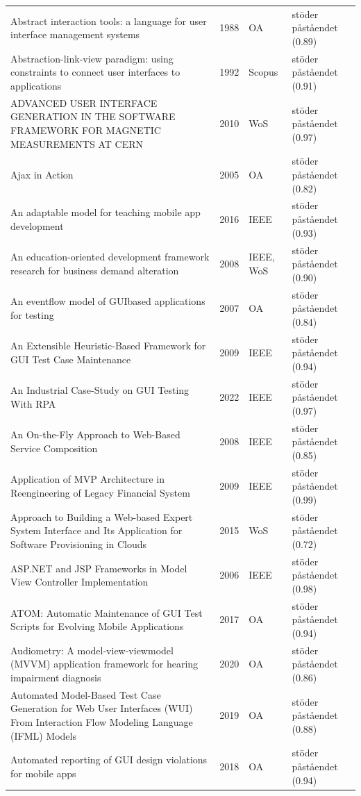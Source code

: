 \begin{longtable}{@{}%
  >{\raggedright\arraybackslash}p{}c%
  >{\raggedright\arraybackslash}p{}%
  >{\raggedright\arraybackslash}p{}@{}}
Abstract interaction tools: a language for user interface management systems & 1988 & OA & stöder påståendet (0.89) \\
Abstraction-link-view paradigm: using constraints to connect user interfaces to applications & 1992 & Scopus & stöder påståendet (0.91) \\
ADVANCED USER INTERFACE GENERATION IN THE SOFTWARE FRAMEWORK FOR MAGNETIC MEASUREMENTS AT CERN & 2010 & WoS & stöder påståendet (0.97) \\
Ajax in Action & 2005 & OA & stöder påståendet (0.82) \\
An adaptable model for teaching mobile app development & 2016 & IEEE & stöder påståendet (0.93) \\
An education-oriented development framework research for business demand alteration & 2008 & IEEE, WoS & stöder påståendet (0.90) \\
An eventflow model of GUIbased applications for testing & 2007 & OA & stöder påståendet (0.84) \\
An Extensible Heuristic-Based Framework for GUI Test Case Maintenance & 2009 & IEEE & stöder påståendet (0.94) \\
An Industrial Case-Study on GUI Testing With RPA & 2022 & IEEE & stöder påståendet (0.97) \\
An On-the-Fly Approach to Web-Based Service Composition & 2008 & IEEE & stöder påståendet (0.85) \\
Application of MVP Architecture in Reengineering of Legacy Financial System & 2009 & IEEE & stöder påståendet (0.99) \\
Approach to Building a Web-based Expert System Interface and Its Application for Software Provisioning in Clouds & 2015 & WoS & stöder påståendet (0.72) \\
ASP.NET and JSP Frameworks in Model View Controller Implementation & 2006 & IEEE & stöder påståendet (0.98) \\
ATOM: Automatic Maintenance of GUI Test Scripts for Evolving Mobile Applications & 2017 & OA & stöder påståendet (0.94) \\
Audiometry: A model-view-viewmodel (MVVM) application framework for hearing impairment diagnosis & 2020 & OA & stöder påståendet (0.86) \\
Automated Model-Based Test Case Generation for Web User Interfaces (WUI) From Interaction Flow Modeling Language (IFML) Models & 2019 & OA & stöder påståendet (0.88) \\
Automated reporting of GUI design violations for mobile apps & 2018 & OA & stöder påståendet (0.94) \\

\end{longtable}
